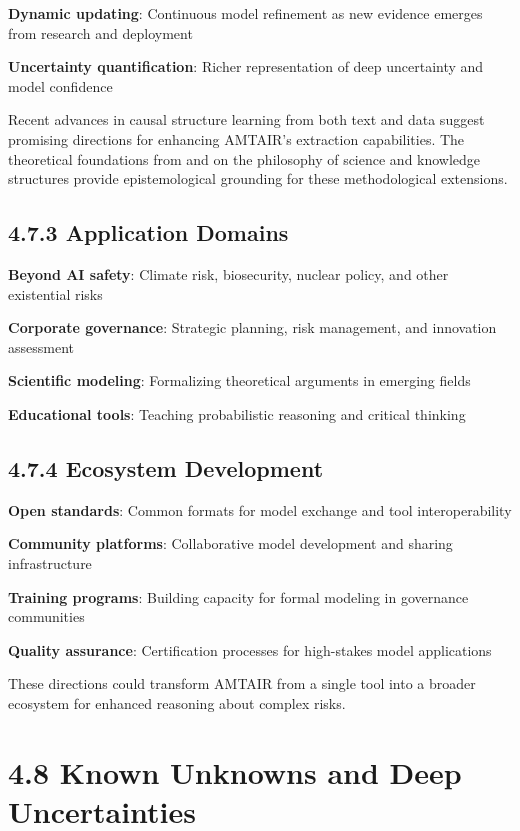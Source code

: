 \documentclass[
  11pt,
  letterpaper,
]{book}
\begin{document}
\textbf{Dynamic updating}: Continuous model refinement as new evidence
emerges from research and deployment

\textbf{Uncertainty quantification}: Richer representation of deep
uncertainty and model confidence

Recent advances in causal structure learning from both text and data
\textcite{babakov2025} \textcite{ban2023} \textcite{bethard2007}
\textcite{chen2023} \textcite{heinze-deml2018} \textcite{squires2023}
\textcite{yang2022} suggest promising directions for enhancing AMTAIR's
extraction capabilities. The theoretical foundations from
\textcite{duhem1954} and \textcite{meyer2022b} on the philosophy of
science and knowledge structures provide epistemological grounding for
these methodological extensions.

\subsection{4.7.3 Application Domains}\label{sec-application-future}

\textbf{Beyond AI safety}: Climate risk, biosecurity, nuclear policy,
and other existential risks

\textbf{Corporate governance}: Strategic planning, risk management, and
innovation assessment

\textbf{Scientific modeling}: Formalizing theoretical arguments in
emerging fields

\textbf{Educational tools}: Teaching probabilistic reasoning and
critical thinking

\subsection{4.7.4 Ecosystem Development}\label{sec-ecosystem-future}

\textbf{Open standards}: Common formats for model exchange and tool
interoperability

\textbf{Community platforms}: Collaborative model development and
sharing infrastructure

\textbf{Training programs}: Building capacity for formal modeling in
governance communities

\textbf{Quality assurance}: Certification processes for high-stakes
model applications

These directions could transform AMTAIR from a single tool into a
broader ecosystem for enhanced reasoning about complex risks.

\section{4.8 Known Unknowns and Deep
Uncertainties}\label{sec-deep-uncertainties}
\end{document}
